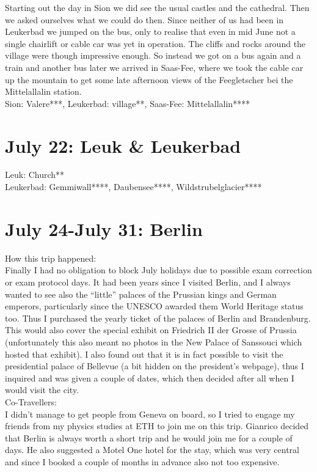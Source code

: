 Starting out the day in Sion we did see the usual castles and the cathedral. Then we asked ourselves what we could do then. Since neither of us had been in Leukerbad we jumped on the bus, only to realise that even in mid June not a single chairlift or cable car was yet in operation. The cliffs and rocks around the village were though impressive enough. So instead we got on a bus again and a train and another bus later we arrived in Saas-Fee, where we took the cable car up the mountain to get some late afternoon views of the Feegletscher bei the Mittelallalin station.\\

Sion: Valere***, Leukerbad: village**, Saas-Fee: Mittelallalin****

\section{July 22: Leuk \& Leukerbad}
\label{Leuk2012}

Leuk: Church**\\
Leukerbad: Gemmiwall****, Daubensee****, Wildstrubelglacier****

\section{July 24-July 31: Berlin}
\label{Berlin2012}

How this trip happened:\\
Finally I had no obligation to block July holidays due to possible exam correction or exam protocol days. It had been years since I visited Berlin, and I always wanted to see also the ``little'' palaces of the Prussian kings and German emperors, particularly since the UNESCO awarded them World Heritage status too. Thus I purchased the yearly ticket of the palaces of Berlin and Brandenburg. This would also cover the special exhibit on Friedrich II der Grosse of Prussia (unfortunately this also meant no photos in the New Palace of Sanssouci which hosted that exhibit). I also found out that it is in fact possible to visit the presidential palace of Bellevue (a bit hidden on the president's webpage), thus I inquired and was given a couple of dates, which then decided after all when I would visit the city.\\

Co-Travellers:\\
I didn't manage to get people from Geneva on board, so I tried to engage my friends from my physics studies at ETH to join me on this trip. Gianrico decided that Berlin is always worth a short trip and he would join me for a couple of days. He also suggested a Motel One hotel for the stay, which was very central and since I booked a couple of months in advance also not too expensive.\\

